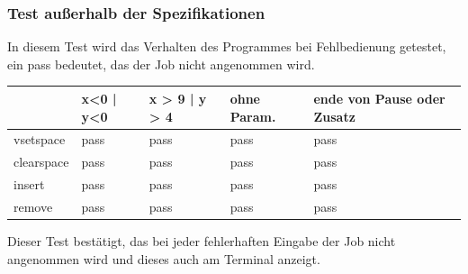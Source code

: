 \subsubsection {Test außerhalb der Spezifikationen}

In diesem Test wird das Verhalten des Programmes bei Fehlbedienung getestet, ein pass bedeutet, das der Job nicht angenommen wird.

\begin{tabular}{|l|l|l|l|l|}
\hline
         	&  x<0 | y<0 & x > 9 | y > 4 & ohne Param.& ende von Pause oder Zusatz\\
\hline
vsetspace & pass & pass & pass & pass \\
\hline
clearspace & pass & pass & pass & pass \\
\hline
insert & pass & pass & pass & pass \\
\hline
remove & pass & pass & pass & pass \\
\hline
\end{tabular}

Dieser Test bestätigt, das bei jeder fehlerhaften Eingabe der Job nicht angenommen wird und dieses auch am Terminal anzeigt.




